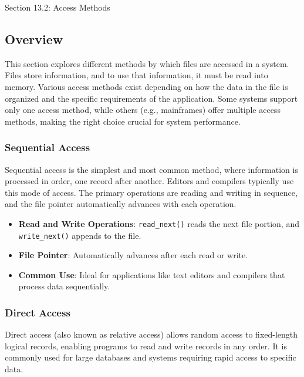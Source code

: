 \begin{notes}{Section 13.2: Access Methods}
    \subsection*{Overview}

    This section explores different methods by which files are accessed in a system. Files store information, and to use that information, it must be read into memory. Various access methods exist 
    depending on how the data in the file is organized and the specific requirements of the application. Some systems support only one access method, while others (e.g., mainframes) offer multiple 
    access methods, making the right choice crucial for system performance.
    
    \subsubsection*{Sequential Access}
    
    Sequential access is the simplest and most common method, where information is processed in order, one record after another. Editors and compilers typically use this mode of access. The primary 
    operations are reading and writing in sequence, and the file pointer automatically advances with each operation.
    
    \begin{highlight}
    
        \begin{itemize}
            \item \textbf{Read and Write Operations}: \texttt{read\_next()} reads the next file portion, and \texttt{write\_next()} appends to the file.
            \item \textbf{File Pointer}: Automatically advances after each read or write.
            \item \textbf{Common Use}: Ideal for applications like text editors and compilers that process data sequentially.
        \end{itemize}
    
    \end{highlight}
    
    \subsubsection*{Direct Access}
    
    Direct access (also known as relative access) allows random access to fixed-length logical records, enabling programs to read and write records in any order. It is commonly used for large databases 
    and systems requiring rapid access to specific data.
    

\end{notes}
